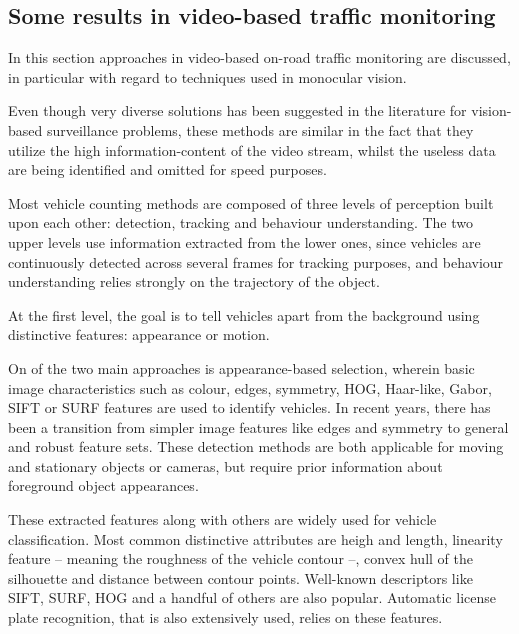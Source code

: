 \subsection{Some results in video-based traffic monitoring}
In this section approaches in video-based on-road traffic monitoring are discussed, in particular with regard to techniques used in monocular vision.

Even though very diverse solutions has been suggested in the literature for vision-based surveillance problems, these methods are similar in the fact that they utilize the high information-content of the video stream, whilst the useless data are being identified and omitted for speed purposes.

Most vehicle counting methods are composed of three levels of perception built upon each other: detection, tracking and behaviour understanding.
The two upper levels use information extracted from the lower ones, since vehicles are continuously detected across several frames for tracking purposes, and behaviour understanding relies strongly on the trajectory of the object.

At the first level, the goal is to tell vehicles apart from the background using distinctive features: appearance or motion.

On of the two main approaches is appearance-based selection, wherein basic image characteristics such as colour\cite{Chang2005}, edges\cite{Blanc2007}, symmetry\cite{Aytekin2010}, HOG\cite{Niknejad2012}, Haar-like\cite{Sivaraman2012}, Gabor\cite{Zhang2006}, SIFT\cite{Zhang2011} or SURF\cite{Lin2012} features are used to identify vehicles.
In recent years, there has been a transition from simpler image features like edges and symmetry to general and robust feature sets\cite{Sivaraman2012}.
These detection methods are both applicable for moving and stationary objects or cameras, but require prior information about foreground object appearances.

These extracted features along with others are widely used for vehicle classification.
Most common distinctive attributes are heigh and length\cite{Huang2004}, linearity feature -- meaning the roughness of the vehicle contour\cite{Zhang2008} --, convex hull of the silhouette\cite{Buch2010} and distance between contour points\cite{Lou2005}.
Well-known descriptors like SIFT\cite{Zhang2011}, SURF\cite{Lin2012}, HOG\cite{Niknejad2012} and a handful of others are also popular.
Automatic license plate recognition, that is also extensively used, relies on these features\cite{Luvizon2016}. 

